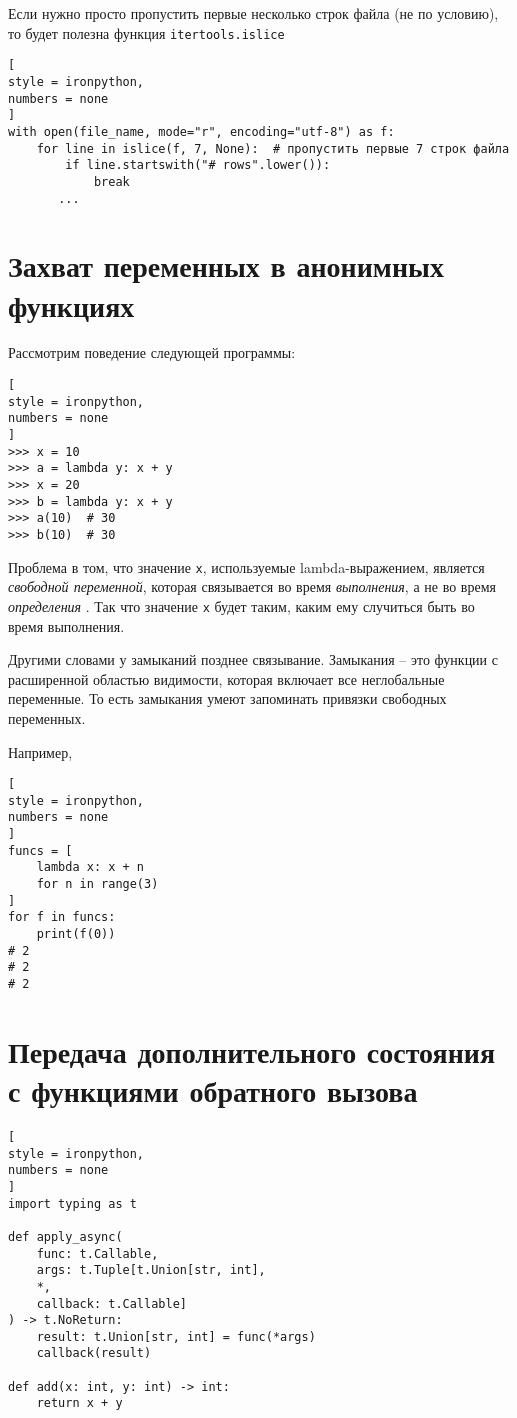 \documentclass[%
	11pt,
	a4paper,
	utf8,
		]{article}
\begin{document}
Если нужно просто пропустить первые несколько строк файла (не по условию), то будет полезна функция \texttt{itertools.islice}
\begin{lstlisting}[
style = ironpython,
numbers = none
]
with open(file_name, mode="r", encoding="utf-8") as f:
    for line in islice(f, 7, None):  # пропустить первые 7 строк файла
        if line.startswith("# rows".lower()):
            break
       ...
\end{lstlisting}

\section{Захват переменных в анонимных функциях}

Рассмотрим поведение следующей программы:
\begin{lstlisting}[
style = ironpython,
numbers = none
]
>>> x = 10
>>> a = lambda y: x + y
>>> x = 20
>>> b = lambda y: x + y
>>> a(10)  # 30
>>> b(10)  # 30
\end{lstlisting}

Проблема в том, что значение \texttt{x}, используемые lambda-выражением, является \emph{свободной переменной}, которая связывается во время \emph{выполнения}, а не во время \emph{определения} \cite[]{beazley:python_cookbook-2019}. Так что значение \texttt{x} будет таким, каким ему случиться быть во время выполнения.


Другими словами у замыканий позднее связывание. Замыкания -- это функции с расширенной областью видимости, которая включает все неглобальные переменные. То есть замыкания умеют запоминать привязки свободных переменных.

Например,
\begin{lstlisting}[
style = ironpython,
numbers = none	
]
funcs = [
    lambda x: x + n
    for n in range(3)
]
for f in funcs:
    print(f(0))
# 2
# 2
# 2
\end{lstlisting}

\section{Передача дополнительного состояния с функциями обратного вызова}

\begin{lstlisting}[
style = ironpython,
numbers = none	
]
import typing as t

def apply_async(
    func: t.Callable,
    args: t.Tuple[t.Union[str, int],
    *,
    callback: t.Callable]
) -> t.NoReturn:
    result: t.Union[str, int] = func(*args)
    callback(result)
    
def add(x: int, y: int) -> int:
    return x + y
\end{lstlisting}
\end{document}

